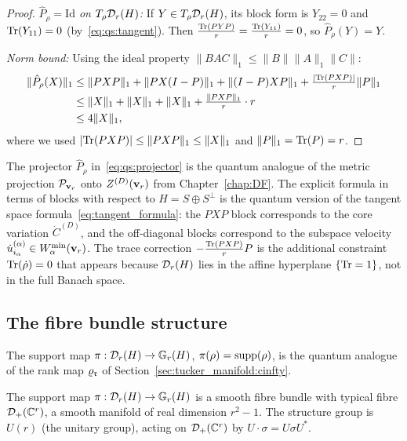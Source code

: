 \begin{proof}
\emph{$\hat P_\rho = \mathrm{Id}$ on $T_\rho\mathcal{D}_{r}(H)$:} If $Y \in
T_\rho\mathcal{D}_{r}(H)$, its block form is $Y_{22} = 0$ and $\mathrm{Tr}(Y_{11})=0$
(by~\eqref{eq:qs:tangent}). Then $\frac{\mathrm{Tr}(PYP)}{r} = \frac{\mathrm{Tr}(Y_{11})}{r} = 0$,
so $\hat P_\rho(Y) = Y$.

\emph{Norm bound:} Using the ideal property $\|BAC\|_1 \leq \|B\|\|A\|_1\|C\|$:
\begin{align*}
    \|\hat P_\rho(X)\|_1
    &\leq \|PXP\|_1 + \|PX(I-P)\|_1 + \|(I-P)XP\|_1
    + \tfrac{|\mathrm{Tr}(PXP)|}{r}\|P\|_1 \\
    &\leq \|X\|_1 + \|X\|_1 + \|X\|_1
    + \tfrac{\|PXP\|_1}{r} \cdot r \\
    &\leq 4\|X\|_1,
\end{align*}
where we used $|\mathrm{Tr}(PXP)| \leq \|PXP\|_1 \leq \|X\|_1$ and
$\|P\|_1 = \mathrm{Tr}(P) = r$.
\end{proof}

\begin{remark}
\label{rem:qs:projector_comparison}
The projector $\hat{P}_\rho$ in~\eqref{eq:qs:projector} is the
quantum analogue of the metric projection $\mathcal{P}_{\mathbf{v}_r}$ onto
$Z^{(D)}(\mathbf{v}_r)$ from Chapter~\ref{chap:DF}. The explicit formula in
terms of blocks with respect to $H = S \oplus S^\perp$ is the
quantum version of the tangent space formula~\eqref{eq:tangent_formula}:
the $PXP$ block corresponds to the core variation $\dot{C}^{(D)}$,
and the off-diagonal blocks correspond to the subspace velocity
$\dot{u}^{(\alpha)}_{i_\alpha} \in W^{\min}_{\alpha}(\mathbf{v}_r)$.
The trace correction $-\frac{\mathrm{Tr}(PXP)}{r}P$ is the additional
constraint $\mathrm{Tr}(\dot\rho) = 0$ that appears because $\mathcal{D}_{r}(H)$
lies in the affine hyperplane $\{\mathrm{Tr} = 1\}$, not in the full Banach
space.
\end{remark}

\subsection*{The fibre bundle structure}

The support map $\pi: \mathcal{D}_{r}(H) \to \mathbb{G}_{r}(H)$,
$\pi(\rho) = \mathrm{supp}(\rho)$, is the quantum analogue of the rank map
$\varrho_{\mathfrak{r}}$ of Section~\ref{sec:tucker_manifold:cinfty}.

\begin{theorem}
\label{thm:qs:bundle}
The support map $\pi: \mathcal{D}_{r}(H) \to \mathbb{G}_{r}(H)$ is a smooth
fibre bundle with typical fibre $\mathcal{D}_+(\mathbb{C}^r)$, a smooth manifold of
real dimension $r^2 - 1$. The structure group is $U(r)$ (the unitary
group), acting on $\mathcal{D}_+(\mathbb{C}^r)$ by $U \cdot \sigma = U \sigma U^*$.
\end{theorem}

